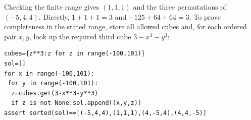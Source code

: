 Checking the finite range gives $\boxed{(1,1,1)}$ and the three permutations of $\boxed{(-5,4,4)}$. Directly, $1+1+1=3$ and $-125+64+64=3$. To prove completeness in the stated range, store all allowed cubes and, for each ordered pair $x,y$, look up the required third cube $3-x^3-y^3$:
\begin{verbatim}
cubes={z**3:z for z in range(-100,101)}
sol=[]
for x in range(-100,101):
 for y in range(-100,101):
  z=cubes.get(3-x**3-y**3)
  if z is not None:sol.append((x,y,z))
assert sorted(sol)==[(-5,4,4),(1,1,1),(4,-5,4),(4,4,-5)]
\end{verbatim}
